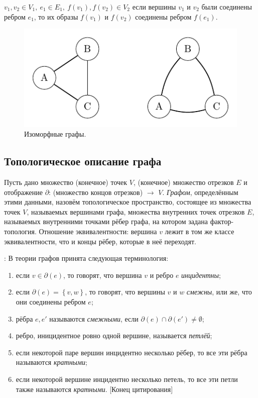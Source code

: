 $v_1, v_2 \in V_1, \ e_1 \in E_1, \ f(v_1), f(v_2) \in V_2$ если вершины $v_1$ и $v_2$ были соединены ребром $e_1$, то их образы $f(v_1)$ и $f(v_2)$ соединены ребром $f(e_1)$.

\begin{figure}[h]
    \centering
    \includegraphics{images/c3.2.pdf}
    \caption{Изоморфные графы.}
    \label{fig:c3.2}
\end{figure}

\subsection{Топологическое описание графа}
\begin{definition}
    Пусть дано множество (конечное) точек $V$, (конечное) множество отрезков $E$ и отображение $\partial$: (множество концов отрезков) $\to$ $V$. \textit{Графом}, определённым этими данными, назовём топологическое пространство, состоящее из множества точек $V$, называемых вершинами графа, множества внутренних точек отрезков $E$, называемых внутренними точками рёбер графа, на котором задана фактор-топология. Отношение эквивалентности: вершина $v$ лежит в том же классе эквивалентности, что и концы рёбер, которые в неё переходят.
\end{definition}

\cite{thebest}: В теории графов принята следующая терминология:
\begin{enumerate}
    \item если $v \in \partial(e)$, то говорят, что вершина $v$ и ребро $e$ \textit{инцидентны};
    \item если $\partial(e) = \left\{v,w\right\}$, то говорят, что вершины $v$ и $w$ \textit{смежны}, или же, что они соединены ребром $e$;
    \item рёбра $e, e'$ называются \textit{смежными}, если $\partial(e) \cap \partial(e') \neq \emptyset$;
    \item ребро, иницидентное ровно одной вершине, называется \textit{петлёй};
    \item если некоторой паре вершин инцидентно несколько рёбер, то все эти рёбра называются \textit{кратными};
    \item если некоторой вершине инцидентно несколько петель, то все эти петли также называются \textit{кратными}. [Конец цитирования]
\end{enumerate}


